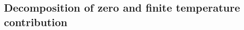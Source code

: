 \documentclass[sn-mathphys,Numbered]{sn-jnl}
\newcommand{\req}[1]{Eq.~(\ref{#1})}
\newcommand{\rf}[1]{Fig.~{\ref{#1}}}
\newcommand*{\MeV}{\text{ MeV}}
\newcommand{\rev}[1]{{\color{blue}#1}}
\begin{document}
\subsection{Decomposition of zero and finite temperature contribution}
\label{Numerical}

\end{document}
